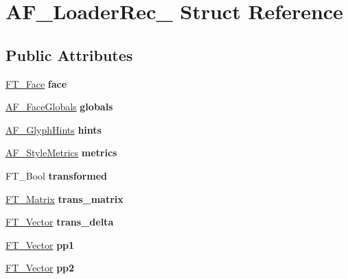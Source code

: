 \hypertarget{struct_a_f___loader_rec__}{}\section{A\+F\+\_\+\+Loader\+Rec\+\_\+ Struct Reference}
\label{struct_a_f___loader_rec__}
\subsection*{Public Attributes}
\begin{DoxyCompactItemize}
\item 
\mbox{\label{struct_a_f___loader_rec___ab5ea3d19d0f92ed0c4340bad6ea9571e}} 
\hyperlink{struct_f_t___face_rec__}{F\+T\+\_\+\+Face} {\bfseries face}
\item 
\mbox{\label{struct_a_f___loader_rec___aaa5bfe9e3eef5e053558791c326abf8b}} 
\hyperlink{struct_a_f___face_globals_rec__}{A\+F\+\_\+\+Face\+Globals} {\bfseries globals}
\item 
\mbox{\label{struct_a_f___loader_rec___a3022af76170c58486149424fe11f23ab}} 
\hyperlink{struct_a_f___glyph_hints_rec__}{A\+F\+\_\+\+Glyph\+Hints} {\bfseries hints}
\item 
\mbox{\label{struct_a_f___loader_rec___ac7c0ebbc7c2c102c0840bb12956044e7}} 
\hyperlink{struct_a_f___style_metrics_rec__}{A\+F\+\_\+\+Style\+Metrics} {\bfseries metrics}
\item 
\mbox{\label{struct_a_f___loader_rec___ac54a07cb9f710a0f469ad80e89f9560f}} 
F\+T\+\_\+\+Bool {\bfseries transformed}
\item 
\mbox{\label{struct_a_f___loader_rec___a5c30f601f3e6b669d52698a4d1bc9371}} 
\hyperlink{struct_f_t___matrix__}{F\+T\+\_\+\+Matrix} {\bfseries trans\+\_\+matrix}
\item 
\mbox{\label{struct_a_f___loader_rec___a5e8868a76379551f81c9e28d9bde9e16}} 
\hyperlink{struct_f_t___vector__}{F\+T\+\_\+\+Vector} {\bfseries trans\+\_\+delta}
\item 
\mbox{\label{struct_a_f___loader_rec___af75ddd1394d03f8a7a7ab50213611ab5}} 
\hyperlink{struct_f_t___vector__}{F\+T\+\_\+\+Vector} {\bfseries pp1}
\item 
\mbox{\label{struct_a_f___loader_rec___a38c518eb3646f0880b1ccc8e9be357fb}} 
\hyperlink{struct_f_t___vector__}{F\+T\+\_\+\+Vector} {\bfseries pp2}
\end{DoxyCompactItemize}


